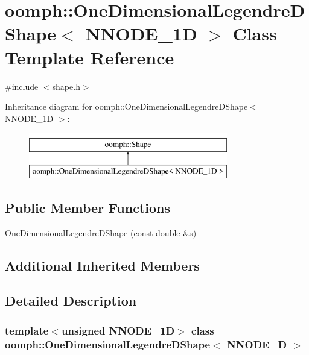 \hypertarget{classoomph_1_1OneDimensionalLegendreDShape}{}\section{oomph\+:\+:One\+Dimensional\+Legendre\+D\+Shape$<$ N\+N\+O\+D\+E\+\_\+1D $>$ Class Template Reference}
\label{classoomph_1_1OneDimensionalLegendreDShape}


{\ttfamily \#include $<$shape.\+h$>$}

Inheritance diagram for oomph\+:\+:One\+Dimensional\+Legendre\+D\+Shape$<$ N\+N\+O\+D\+E\+\_\+1D $>$\+:\begin{figure}[H]
\begin{center}
\leavevmode
\includegraphics[height=2.000000cm]{classoomph_1_1OneDimensionalLegendreDShape}
\end{center}
\end{figure}
\subsection*{Public Member Functions}
\begin{DoxyCompactItemize}
\item 
\hyperlink{classoomph_1_1OneDimensionalLegendreDShape_a85066e08a63c0c494511fabaee6a684d}{One\+Dimensional\+Legendre\+D\+Shape} (const double \&\hyperlink{cfortran_8h_ab7123126e4885ef647dd9c6e3807a21c}{s})
\end{DoxyCompactItemize}
\subsection*{Additional Inherited Members}


\subsection{Detailed Description}
\subsubsection*{template$<$unsigned N\+N\+O\+D\+E\+\_\+1D$>$\newline
class oomph\+::\+One\+Dimensional\+Legendre\+D\+Shape$<$ N\+N\+O\+D\+E\+\_\+D $>$}



